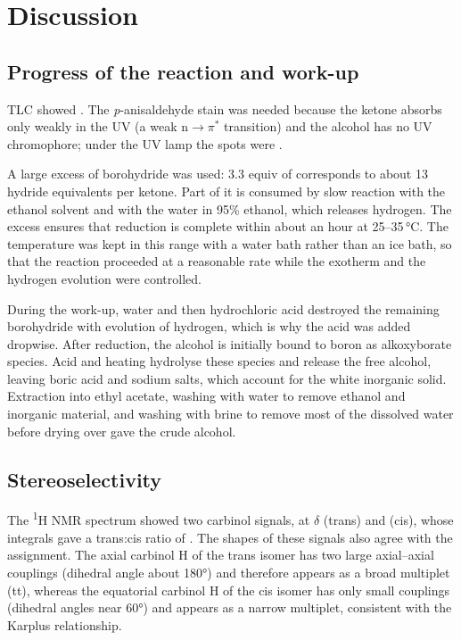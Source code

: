 \documentclass[11pt,a4paper]{article}
\begin{document}
\section{Discussion}

\subsection{Progress of the reaction and work-up}
TLC showed . The \emph{p}-anisaldehyde stain was needed because the ketone absorbs only weakly in the UV (a weak n$\rightarrow\pi^*$ transition) and the alcohol has no UV chromophore; under the UV lamp the spots were .

A large excess of borohydride was used: 3.3 equiv of  corresponds to about 13 hydride equivalents per ketone. Part of it is consumed by slow reaction with the ethanol solvent and with the water in 95\% ethanol, which releases hydrogen. The excess ensures that reduction is complete within about an hour at 25--35\,\si{\celsius}. The temperature was kept in this range with a water bath rather than an ice bath, so that the reaction proceeded at a reasonable rate while the exotherm and the hydrogen evolution were controlled.

During the work-up, water and then hydrochloric acid destroyed the remaining borohydride with evolution of hydrogen, which is why the acid was added dropwise. After reduction, the alcohol is initially bound to boron as alkoxyborate species. Acid and heating hydrolyse these species and release the free alcohol, leaving boric acid and sodium salts, which account for the white inorganic solid. Extraction into ethyl acetate, washing with water to remove ethanol and inorganic material, and washing with brine to remove most of the dissolved water before drying over  gave the crude alcohol.

\subsection{Stereoselectivity}
The \textsuperscript{1}H NMR spectrum showed two carbinol signals, at $\delta$  (trans) and  (cis), whose integrals gave a trans:cis ratio of . The shapes of these signals also agree with the assignment. The axial carbinol H of the trans isomer has two large axial--axial couplings (dihedral angle about 180\si{\degree}) and therefore appears as a broad multiplet (tt), whereas the equatorial carbinol H of the cis isomer has only small couplings (dihedral angles near 60\si{\degree}) and appears as a narrow multiplet, consistent with the Karplus relationship.\cite{Karplus1959} 
\end{document}
